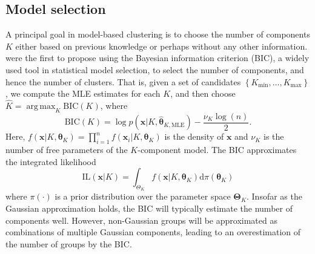 \documentclass{uwstat572}
\newcommand*\set[1]{\left\{#1\right\}}
\newcommand*\estim[1]{\widehat{#1}}
\newcommand*\der{\text{d}}
\newcommand*\bx{\mathbf{x}}
\newcommand*\btheta{\boldsymbol{\theta}}
\newcommand*\bTheta{\boldsymbol{\Theta}}
\DeclareMathOperator*{\argmax}{arg\;max}
\renewcommand\;{\,}
\begin{document}
\subsection{Model selection}
A principal goal in model-based clustering is to choose the number of components $K$ either based on previous knowledge or perhaps without any other information.
\citet{Dasgupta98} were the first to propose using the Bayesian information criterion (BIC), a widely used tool in statistical model selection, to select the number of components, and hence the number of clusters. 
That is, given a set of candidates $\set{K_\text{min}, \dotsc, K_\text{max}}$, we compute the MLE estimates for each $K$, and then choose $\estim K = \argmax_K \text{BIC}(K)$, where
\begin{equation}\label{BIC}
\text{BIC}(K) 
	= \log p(\bx | K, \estim\btheta_{K, \text{MLE}})
		- \frac{ \nu_K \log(n) }{2}.
\end{equation}
Here,
$f(\bx | K, \btheta_K) = \prod_{i = 1}^n f(\bx_i | K, \btheta_K)$ is the density of $\bx$ and
 $\nu_K$ is the number of free parameters of the $K$-component model.
The BIC approximates the integrated likelihood
\begin{equation}\label{IL}
\text{IL}(\bx | K)
	 = \int_{\Theta_K} f(\bx | K, \btheta_K) \der \pi(\btheta_K)
\end{equation}
where $\pi(\cdot)$ is a prior distribution over the parameter space $\bTheta_K$.
Insofar as the Gaussian approximation holds, the BIC will typically estimate the number of components well.
However, non-Gaussian groups will be approximated as combinations of multiple Gaussian components, leading to an overestimation of the number of groups by the BIC. 
\end{document}
